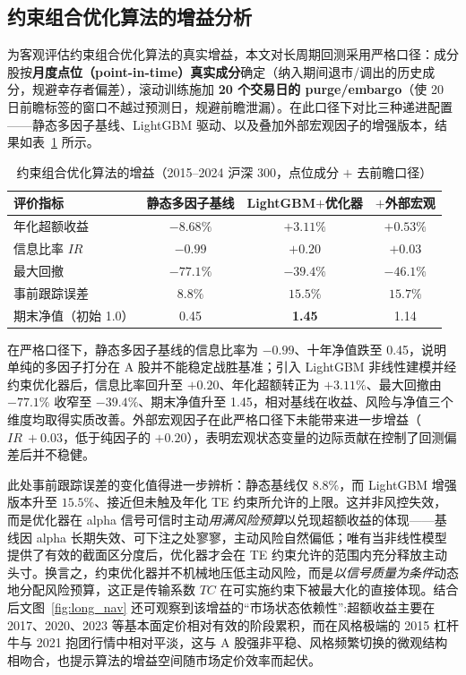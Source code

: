 \subsection{约束组合优化算法的增益分析}
\label{subsec:cpo_gain}
为客观评估约束组合优化算法的真实增益，本文对长周期回测采用严格口径：成分股按\textbf{月度点位（point-in-time）真实成分}确定（纳入期间退市/调出的历史成分，规避幸存者偏差），滚动训练施加 \textbf{20 个交易日的 purge/embargo}（使 20 日前瞻标签的窗口不越过预测日，规避前瞻泄漏）。在此口径下对比三种递进配置——静态多因子基线、LightGBM 驱动、以及叠加外部宏观因子的增强版本，结果如表~\ref{tab:cpo_gain} 所示。

\begin{table}[htbp]
\centering
\caption{约束组合优化算法的增益（2015--2024 沪深 300，点位成分 $+$ 去前瞻口径）}
\label{tab:cpo_gain}
\begin{tabular}{lccc}
\toprule
\textbf{评价指标} & \textbf{静态多因子基线} & \textbf{LightGBM$+$优化器} & \textbf{$+$外部宏观} \\
\midrule
年化超额收益 & $-8.68\%$ & \textbf{$+3.11\%$} & $+0.53\%$ \\
信息比率 $IR$ & $-0.99$ & \textbf{$+0.20$} & $+0.03$ \\
最大回撤 & $-77.1\%$ & \textbf{$-39.4\%$} & $-46.1\%$ \\
事前跟踪误差 & $8.8\%$ & $15.5\%$ & $15.7\%$ \\
期末净值（初始 1.0） & 0.45 & \textbf{1.45} & 1.14 \\
\bottomrule
\end{tabular}
\end{table}

在严格口径下，静态多因子基线的信息比率为 $-0.99$、十年净值跌至 0.45，说明单纯的多因子打分在 A 股并不能稳定战胜基准；引入 LightGBM 非线性建模并经约束优化器后，信息比率回升至 $+0.20$、年化超额转正为 $+3.11\%$、最大回撤由 $-77.1\%$ 收窄至 $-39.4\%$、期末净值升至 1.45，相对基线在收益、风险与净值三个维度均取得实质改善。外部宏观因子在此严格口径下未能带来进一步增益（$IR\ +0.03$，低于纯因子的 $+0.20$），表明宏观状态变量的边际贡献在控制了回测偏差后并不稳健。

此处事前跟踪误差的变化值得进一步辨析：静态基线仅 $8.8\%$，而 LightGBM 增强版本升至 $15.5\%$、接近但未触及年化 TE 约束所允许的上限。这并非风控失效，而是优化器在 alpha 信号可信时主动\emph{用满风险预算}以兑现超额收益的体现——基线因 alpha 长期失效、可下注之处寥寥，主动风险自然偏低；唯有当非线性模型提供了有效的截面区分度后，优化器才会在 TE 约束允许的范围内充分释放主动头寸。换言之，约束优化器并不机械地压低主动风险，而是\emph{以信号质量为条件}动态地分配风险预算，这正是传输系数 $TC$ 在可实施约束下被最大化的直接体现。结合后文图~\ref{fig:long_nav} 还可观察到该增益的``市场状态依赖性'':超额收益主要在 2017、2020、2023 等基本面定价相对有效的阶段累积，而在风格极端的 2015 杠杆牛与 2021 抱团行情中相对平淡，这与 A 股强非平稳、风格频繁切换的微观结构相吻合，也提示算法的增益空间随市场定价效率而起伏。

